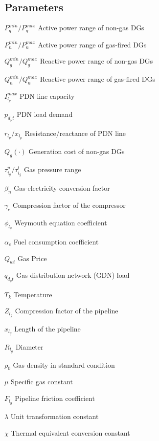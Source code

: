 \documentclass[journal]{IEEEtran}
\begin{document}
\subsection{Parameters}
\begin{IEEEdescription}
\item [$P_{g}^{min}/P_{g}^{max}$]  Active power range of non-gas DGs
\item [$P_{n}^{min}/P_{n}^{max}$]  Active power range of gas-fired DGs
\item [$Q_{g}^{min}/Q_{g}^{max}$]  Reactive power range of non-gas DGs
\item [$Q_{n}^{min}/Q_{n}^{max}$]  Reactive power range of gas-fired DGs
\item [$I_{l_p}^{max}$]  PDN line capacity
\item [$p_{d_pt}$]  PDN load demand
\item [$r_{l_p}/x_{l_p}$]  Resistance/reactance of PDN line
\item [$Q_{g}(\cdot)$]  Generation cost of non-gas DGs
\item [$\tau^u_{i_g}/\tau^l_{i_g}$]  Gas pressure range
\item [$\beta_n$]   Gas-electricity conversion factor
\item [$\gamma_c$]  Compression factor of the compressor
\item [$\phi_{l_g}$]  Weymouth equation coefficient
\item [$\alpha_c$]  Fuel consumption coefficient
\item [$Q_{wt}$]  Gas Price
\item [$q_{d_gt}$]  Gas distribution network (GDN) load
\item [$T_k$]   Temperature
\item [$Z_{l_g}$]  Compression factor of the pipeline
\item [$x_{l_g}$]  Length of the pipeline
\item [$R_{l_g}$]  Diameter
\item [$\rho_0$]  Gas density in standard condition
\item [$\mu$]  Specific gas constant
\item [$F_{l_g}$]  Pipeline friction coefficient
\item [$\lambda$]  Unit transformation constant
\item [$\chi$]  Thermal equivalent conversion constant
\end{IEEEdescription}
\end{document}
